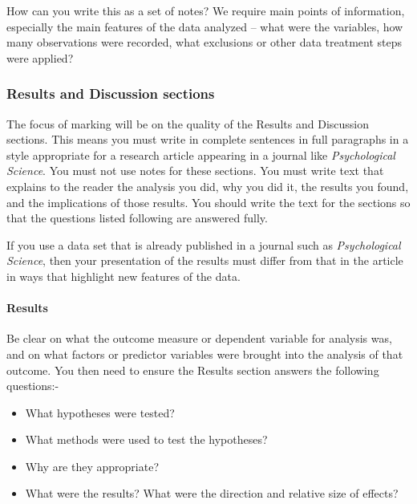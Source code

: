 \documentclass[
  letterpaper,
  DIV=11,
  numbers=noendperiod]{scrreprt}
\let\oldparagraph\paragraph
\renewcommand{\paragraph}[1]{\oldparagraph{#1}\mbox{}}
\providecommand{\tightlist}{%
  \setlength{\itemsep}{0pt}\setlength{\parskip}{0pt}}\usepackage{longtable,booktabs,array}
\begin{document}
How can you write this as a set of notes? We require main points of
information, especially the main features of the data analyzed -- what
were the variables, how many observations were recorded, what exclusions
or other data treatment steps were applied?

\hypertarget{sec-what-content-results-discussion}{%
\subsubsection{Results and Discussion
sections}\label{sec-what-content-results-discussion}}

The focus of marking will be on the quality of the Results and
Discussion sections. This means you must write in complete sentences in
full paragraphs in a style appropriate for a research article appearing
in a journal like \emph{Psychological Science}. You must not use notes
for these sections. You must write text that explains to the reader the
analysis you did, why you did it, the results you found, and the
implications of those results. You should write the text for the
sections so that the questions listed following are answered fully.

If you use a data set that is already published in a journal such as
\emph{Psychological Science}, then your presentation of the results must
differ from that in the article in ways that highlight new features of
the data.

\hypertarget{sec-what-content-results}{%
\paragraph{Results}\label{sec-what-content-results}}

Be clear on what the outcome measure or dependent variable for analysis
was, and on what factors or predictor variables were brought into the
analysis of that outcome. You then need to ensure the Results section
answers the following questions:-

\begin{itemize}
\tightlist
\item
  What hypotheses were tested?
\item
  What methods were used to test the hypotheses?
\item
  Why are they appropriate?
\item
  What were the results? What were the direction and relative size of
  effects?
\end{itemize}
\end{document}
